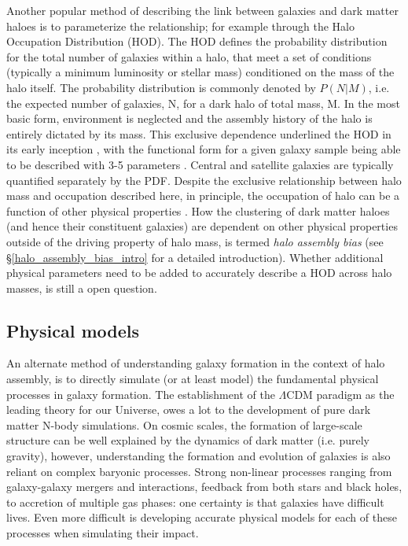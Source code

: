 Another popular method of describing the link between galaxies and dark matter haloes is to parameterize the relationship; for example through the Halo Occupation Distribution (HOD). The HOD defines the probability distribution for the total number of galaxies within a halo, that meet a set of conditions (typically a minimum luminosity or stellar mass) conditioned on the mass of the halo itself. The probability distribution is commonly denoted by $P(N|M)$, i.e. the expected number of galaxies, N, for a dark halo of total mass, M. In the most basic form, environment is neglected and the assembly history of the halo is entirely dictated by its mass. This exclusive dependence underlined the HOD in its early inception \citep[e.g.][]{jing1998, peacock2000, scoccimarro2001}, with the functional form for a given galaxy sample being able to be described with 3-5 parameters \citep[e.g. see equations 1 and 3 of][]{zheng2005}. Central and satellite galaxies are typically quantified separately by the PDF. Despite the exclusive relationship between halo mass and occupation described here, in principle, the occupation of halo can be a function of other physical properties \citep[e.g. such as environment and halo age;][]{zehavi2018}. How the clustering of dark matter haloes (and hence their constituent galaxies) are dependent on other physical properties outside of the driving property of halo mass, is termed \textit{halo assembly bias} (see \S\ref{halo_assembly_bias_intro} for a detailed introduction). Whether additional physical parameters need to be added to accurately describe a HOD across halo masses, is still a open question. 

\subsection{Physical models}
An alternate method of understanding galaxy formation in the context of halo assembly, is to directly simulate (or at least model) the fundamental physical processes in galaxy formation. 
The establishment of the $\Lambda$CDM paradigm as the leading theory for our Universe, owes a lot to the development of pure dark matter N-body simulations. On cosmic scales, the formation of large-scale structure can be well explained by the dynamics of dark matter (i.e. purely gravity), however, understanding the formation and evolution of galaxies is also reliant on complex baryonic processes. Strong non-linear processes ranging from galaxy-galaxy mergers and interactions, feedback from both stars and black holes, to accretion of multiple gas phases: one certainty is that galaxies have difficult lives. Even more difficult is developing accurate physical models for each of these processes when simulating their impact.

